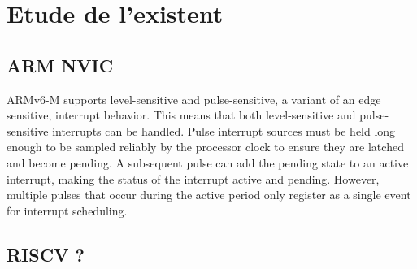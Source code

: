 \section{Etude de l'existent}

\subsection*{ARM NVIC}
ARMv6-M supports level-sensitive and pulse-sensitive, a variant of an edge sensitive, interrupt behavior. This
means that both level-sensitive and pulse-sensitive interrupts can be handled. Pulse interrupt sources must be held
long enough to be sampled reliably by the processor clock to ensure they are latched and become pending. A
subsequent pulse can add the pending state to an active interrupt, making the status of the interrupt active and
pending. However, multiple pulses that occur during the active period only register as a single event for interrupt
scheduling.

\subsection*{RISCV ?}
